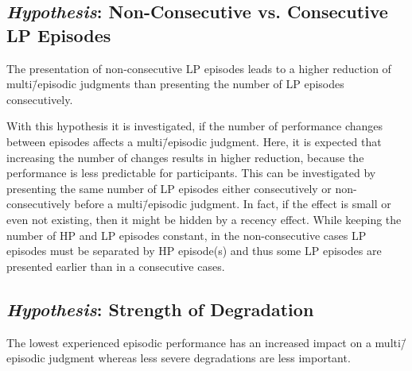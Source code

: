 \subsection[H3: Non-Consecutive vs. Consecutive \acs{LP} Episodes]{\emph{Hypothesis}: Non-Consecutive vs. Consecutive \acs{LP} Episodes}
\begin{hypothesis}\label{hypo:consecutive}
The presentation of non-consecutive \ac{LP} episodes leads to a higher reduction of multi\=/episodic judgments than presenting the number of \ac{LP} episodes consecutively.
\end{hypothesis}

With this hypothesis it is investigated, if the number of performance changes between episodes affects a multi\=/episodic judgment.
Here, it is expected that increasing the number of changes results in higher reduction, because the performance is less predictable for participants.
This can be investigated by presenting the same number of \ac{LP} episodes either consecutively or non-consecutively before a multi\=/episodic judgment.
In fact, if the effect is small or even not existing, then it might be hidden by a recency effect.
While keeping the number of \ac{HP} and \ac{LP} episodes constant, in the non-consecutive cases \ac{LP} episodes must be separated by \ac{HP} episode(s) and thus some \ac{LP} episodes are presented earlier than in a consecutive cases.

\subsection[H4: Strength of Degradation]{\emph{Hypothesis}: Strength of Degradation}
\begin{hypothesis}\label{hypo:strength}
The lowest experienced episodic performance has an increased impact on a multi\=/episodic judgment whereas less severe degradations are less important.
\end{hypothesis}

